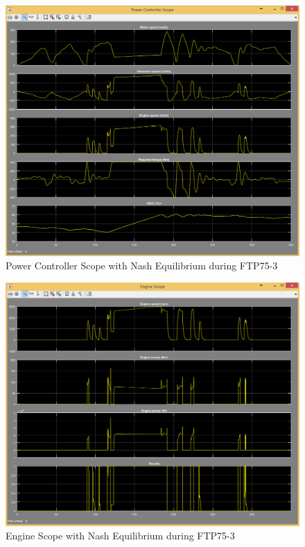 \begin{figure}[h]
\centering
\includegraphics[scale=0.4]{figures/NashEquilibrium/FTP75-3/powerController15Juni}
\caption{Power Controller Scope with Nash Equilibrium during FTP75-3}
\label{fig:pcne3}
\end{figure}

\begin{figure}[h]
\centering
\includegraphics[scale=0.37]{figures/NashEquilibrium/FTP75-3/engine15Juni}
\caption{Engine Scope with Nash Equilibrium during FTP75-3}
\label{fig:ene3}
\end{figure}

